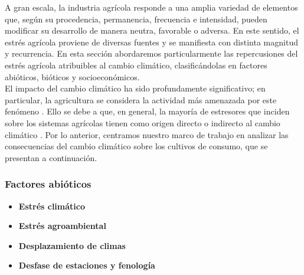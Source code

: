 A gran escala, la industria agrícola responde a una amplia variedad de elementos que, según su procedencia, permanencia, frecuencia e intensidad, pueden modificar su desarrollo de manera neutra, favorable o adversa. En este sentido, el estrés agrícola proviene de diversas fuentes y se manifiesta con distinta magnitud y recurrencia. En esta sección abordaremos particularmente las repercusiones del estrés agrícola atribuibles al cambio climático, clasificándolas en factores abióticos, bióticos y socioeconómicos.\\

El impacto del cambio climático ha sido profundamente significativo; en particular, la agricultura se considera la actividad más amenazada por este fenómeno \cite{Boyer_1982, Raza_2019}. Ello se debe a que, en general, la mayoría de estresores que inciden sobre los sistemas agrícolas tienen como origen directo o indirecto al cambio climático \cite{Olschewski_2024, Raza_2019, Surowka_2020}. Por lo anterior, centramos nuestro marco de trabajo en analizar las consecuencias del cambio climático sobre los cultivos de consumo, que se presentan a continuación.

\subsubsection{Factores abióticos}
\begin{itemize}[leftmargin=0cm, itemsep=0.5 cm]
\item[]\textbf{Estrés climático\\}


\item[]\textbf{Estrés agroambiental\\}
\item[]\textbf{Desplazamiento de climas\\}
\item[]\textbf{Desfase de estaciones y fenología\\}
\end{itemize}


